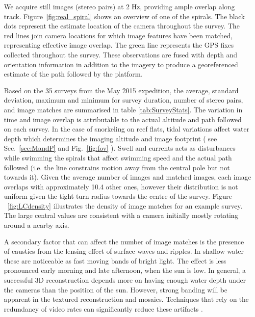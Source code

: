 We acquire still images (stereo pairs) at 2 Hz, providing ample overlap along track. Figure~\ref{fig:real_spiral} shows an overview of one of the spirals.  The black dots represent the estimate location of the camera throughout the survey.  The red lines join camera locations for which image features have been matched, representing effective image overlap.  The green line represents the GPS fixes collected throughout the survey.  These observations are fused with depth and orientation information in addition to the imagery to produce a georeferenced estimate of the path followed by the platform.

Based on the 35 surveys from the May 2015 expedition, the average, standard deviation, maximum and minimum for survey duration, number of stereo pairs, and image matches are summarised in table \ref{tab:SurveyStats}. The variation in time and image overlap is attributable to the actual altitude and path followed on each survey. In the case of snorkeling on reef flats, tidal variations affect water depth which determines the imaging altitude and image footprint ( see Sec.~\ref{sec:MandP} and Fig.~\ref{fig:fov} ). Swell and currents acts as disturbances while swimming the spirals that affect swimming speed and the actual path followed (i.e. the line constrains motion away from the central pole but not towards it). Given the average number of images and matched images, each image overlaps with approximately 10.4 other ones, however their distribution is not uniform given the tight turn radius towards the centre of the survey. Figure ~\ref{fig:LCdensity} illustrates the density of image matches for an example survey. The large central values are consistent with a camera initially mostly rotating around a nearby axis. 

A secondary factor that can affect the number of image matches is the presence of caustics from the lensing effect of surface waves and ripples. In shallow water these are noticeable as fast moving bands of bright light. The effect is less pronounced early morning and late afternoon, when the sun is low. In general, a successful 3D reconstruction depends more on having enough water depth under the cameras than the position of the sun. However, strong banding will be apparent in the textured reconstruction and mosaics. Techniques that rely on the redundancy of video rates can significantly reduce these artifacts \cite{Gracias_2008}.


